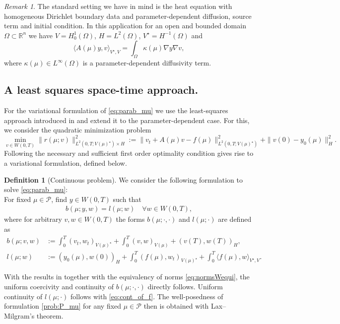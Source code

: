 \documentclass{article}
\theoremstyle{plain}
\theoremstyle{definition}
\newtheorem{definition}[theorem]{Definition}
\theoremstyle{remark}
\newtheorem{remark}[theorem]{Remark}
\begin{document}
\begin{remark}
The standard setting we have in mind is the heat equation with homogeneous Dirichlet boundary data and parameter-dependent diffusion, source term and initial condition. In this application for an open and bounded domain $\Omega \subset \mathbb{R}^n$ we have $V= H^1_0(\Omega)$, $H=L^2(\Omega)$, $V^\star=H^{-1}(\Omega)$ and
\begin{equation}
    \langle A(\mu) y,v\rangle_{V^\star,V} = \int_\Omega \kappa(\mu) \nabla y \nabla v ,
\end{equation}
where $\kappa(\mu) \in L^\infty(\Omega)$ is a parameter-dependent diffusivity term.
\end{remark}

\subsection{A least squares space-time approach.}
For the variational formulation of \eqref{eq:parab_mu} we use the least-squares approach  introduced in  \cite{preprint_SP} and  extend it to the parameter-dependent case. For this, we consider the quadratic  minimization problem 
\begin{equation}\label{eq:minresid}
    \min_{v\in W(0,T)} \|r(\mu; v)\|^2_{{ L^2(0,T;V(\mu)^\star)}\times H} 
    := \|v_t+A(\mu)v-f(\mu)\|^2_{ L^2(0,T;V(\mu)^\star)}+\|v(0)-y_0(\mu)\|^2_H.
\end{equation}
Following \cite{preprint_SP} the necessary and sufficient first order optimality condition gives rise to a variational formulation, defined below.
\begin{definition}[Continuous problem]
We consider the following formulation to solve \eqref{eq:parab_mu}:\\
For fixed $\mu \in \mathcal{P}$, find $y \in W(0,T)$ such that
\begin{align}
    b(\mu; y,w) = l(\mu; w) \quad \forall w \in W(0,T),\label{prob:P_mu}\tag{$\ddagger$}
\end{align}
where for arbitrary $v,w\in W(0,T)$ the forms $b(\mu; \cdot, \cdot)$ and $l(\mu; \cdot)$ are defined as
\begin{align}
  b(\mu; v,w) &:= \int_0^T (v_t,w_t)_{V(\mu)^\star}+ \int_0^T(v,w)_{V(\mu)}  + (v(T),w(T))_H , \label{eq:b_def_mu}\\
    l(\mu; w)&:=(y_0(\mu),w(0))_H 
    + \int_0^T (f(\mu),w_t)_{V(\mu)^\star}
    + \int_0^T \langle f(\mu),w\rangle_{V^\star,V}. 
    \label{eq:l_def_mu}
\end{align}
\end{definition}
With the results in \cite{preprint_SP} together with the equivalency of norms \eqref{eq:normsWequi}, the uniform coercivity and continuity of $b(\mu; \cdot, \cdot)$ directly follows. Uniform continuity of $l(\mu; \cdot)$ follows with \eqref{eq:cont_of_f}. The well-posedness of formulation \eqref{prob:P_mu} for any fixed $\mu \in \mathcal P$ then is obtained with Lax--Milgram's theorem.
\end{document}
